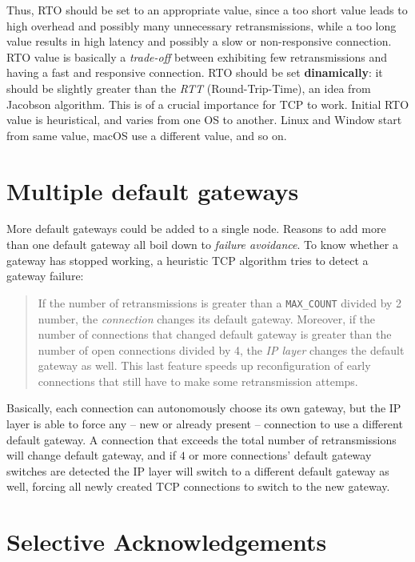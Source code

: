 \documentclass[10pt]{book}
\begin{document}
Thus, RTO should be set to an appropriate value, since a too short value leads
to high overhead and possibly many unnecessary retransmissions, while a too
long value results in high latency and possibly a slow or non-responsive
connection. RTO value is basically a \emph{trade-off} between exhibiting few
retransmissions and having a fast and responsive connection. RTO should be set
\textbf{dinamically}: it should be slightly greater than the \emph{RTT}
(Round-Trip-Time), an idea from Jacobson algorithm. This is of a crucial
importance for TCP to work. Initial RTO value is heuristical, and varies from
one OS to another. Linux and Window start from same value, macOS use a
different value, and so on.


\section{Multiple default gateways}

More default gateways could be added to a single node. Reasons to add more than
one default gateway all boil down to \emph{failure avoidance}. To know whether a
gateway has stopped working, a heuristic TCP algorithm tries to detect a gateway failure:

\begin{quote}
    If the number of retransmissions is greater than a \texttt{MAX\_COUNT}
    divided by 2 number, the \emph{connection} changes its default gateway.
    Moreover, if the number of connections that changed default gateway is
    greater than the number of open connections divided by 4, the \emph{IP
    layer} changes the default gateway as well. This last feature speeds up
    reconfiguration of early connections that still have to make some
    retransmission attemps.
\end{quote}

Basically, each connection can autonomously choose its own gateway, but the IP
layer is able to force any \--- new or already present \--- connection to use a
different default gateway. A connection that exceeds the total number of
retransmissions will change default gateway, and if $4$ or more connections'
default gateway switches are detected the IP layer will switch to a different
default gateway as well, forcing all newly created TCP connections to switch to
the new gateway.

\section{Selective Acknowledgements}
\end{document}
